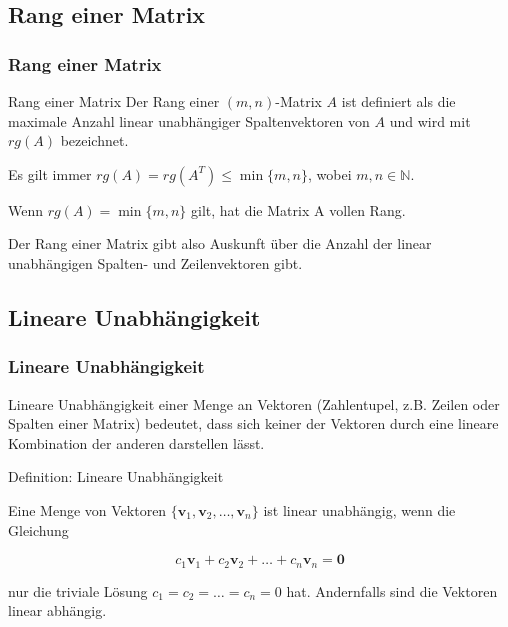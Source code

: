 \documentclass{beamer}
\begin{document}
\subsection{Rang einer Matrix}
\begin{frame}
  \frametitle{Rang einer Matrix}
  
  \begin{block}{Rang einer Matrix}
  Der Rang einer $(m, n)$-Matrix $A$ ist definiert als die maximale Anzahl linear unabhängiger Spaltenvektoren von $A$ und wird mit $rg(A)$ bezeichnet.
  \end{block}
  
  \vspace{0.3cm}
  
  Es gilt immer $rg(A) = rg(A^T) \leq \min\{m, n\}$, wobei $m, n \in \mathbb{N}$.
  
  \vspace{0.3cm}
  
  Wenn $rg(A) = \min\{m, n\}$ gilt, hat die Matrix A vollen Rang.
  
  \vspace{0.3cm}
  
  Der Rang einer Matrix gibt also  Auskunft über die Anzahl der linear unabhängigen Spalten- und Zeilenvektoren gibt.
\end{frame}

\subsection{Lineare Unabhängigkeit}
\begin{frame}
  \frametitle{Lineare Unabhängigkeit}
  
  Lineare Unabhängigkeit einer Menge an Vektoren (Zahlentupel, z.B. Zeilen oder Spalten einer Matrix) bedeutet, dass sich keiner der Vektoren durch eine lineare Kombination der anderen darstellen lässt.
  
  \vspace{0.3cm}
  
  \begin{block}{Definition: Lineare Unabhängigkeit}
  
  Eine Menge von Vektoren $\{\mathbf{v}_1, \mathbf{v}_2, \ldots, \mathbf{v}_n\}$ ist linear unabhängig, wenn die Gleichung
  
  \[
  c_1 \mathbf{v}_1 + c_2 \mathbf{v}_2 + \ldots + c_n \mathbf{v}_n = \mathbf{0}
  \]
  
  nur die triviale Lösung $c_1 = c_2 = \ldots = c_n = 0$ hat. Andernfalls sind die Vektoren linear abhängig.
  \end{block} 
\end{frame}
\end{document}
